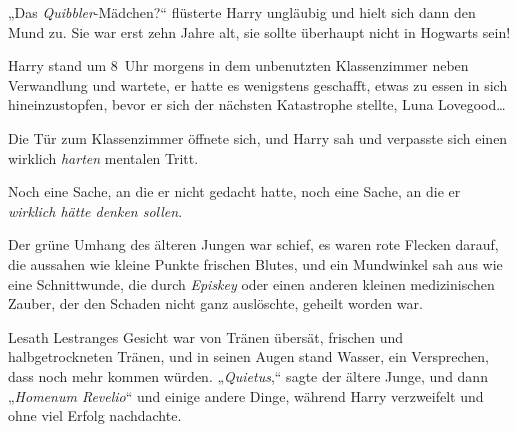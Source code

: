 „Das \emph{Quibbler}-Mädchen?“ flüsterte Harry ungläubig und hielt sich dann den Mund zu. Sie war erst zehn Jahre alt, sie sollte überhaupt nicht in Hogwarts sein!


Harry stand um 8~Uhr morgens in dem unbenutzten Klassenzimmer neben Verwandlung und wartete, er hatte es wenigstens geschafft, etwas zu essen in sich hineinzustopfen, bevor er sich der nächsten Katastrophe stellte, Luna Lovegood…

Die Tür zum Klassenzimmer öffnete sich, und Harry sah und verpasste sich einen wirklich \emph{harten} mentalen Tritt.

Noch eine Sache, an die er nicht gedacht hatte, noch eine Sache, an die er \emph{wirklich hätte denken sollen}.

Der grüne Umhang des älteren Jungen war schief, es waren rote Flecken darauf, die aussahen wie kleine Punkte frischen Blutes, und ein Mundwinkel sah aus wie eine Schnittwunde, die durch \emph{Episkey} oder einen anderen kleinen medizinischen Zauber, der den Schaden nicht ganz auslöschte, geheilt worden war.

Lesath Lestranges Gesicht war von Tränen übersät, frischen und halbgetrockneten Tränen, und in seinen Augen stand Wasser, ein Versprechen, dass noch mehr kommen würden. „\emph{Quietus},“ sagte der ältere Junge, und dann „\emph{Homenum Revelio}“ und einige andere Dinge, während Harry verzweifelt und ohne viel Erfolg nachdachte.

